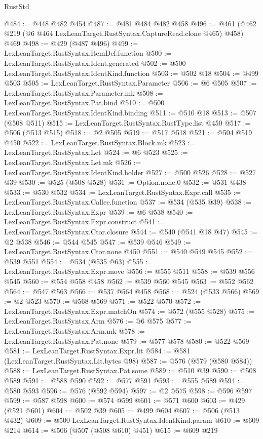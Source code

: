 \begin{lexlean}{RustStd}
\begin{coremodule}
@484 := @448 @482 @454
@487 := @481 @484 @482 @458
@496 := @461 (@462 @219 (@6 @464 LexLeanTarget.RustSyntax.CaptureRead.clone @465) @458) @469
@498 := @429 (@487 @496)
@499 := LexLeanTarget.RustSyntax.ItemDef.function
@500 := LexLeanTarget.RustSyntax.Ident.generated
@502 := @500 LexLeanTarget.RustSyntax.IdentKind.function
@503 := @502 @18
@504 := @499 @503
@505 := LexLeanTarget.RustSyntax.Parameter
@506 := @6 @505
@507 := LexLeanTarget.RustSyntax.Parameter.mk
@508 := LexLeanTarget.RustSyntax.Pat.bind
@510 := @500 LexLeanTarget.RustSyntax.IdentKind.binding
@511 := @510 @18
@513 := @507 (@508 @511)
@515 := LexLeanTarget.RustSyntax.RustType.list @450
@517 := @506 (@513 @515)
@518 := @2 @505
@519 := @517 @518
@521 := @504 @519 @450
@522 := LexLeanTarget.RustSyntax.Block.mk
@523 := LexLeanTarget.RustSyntax.Let
@524 := @6 @523
@525 := LexLeanTarget.RustSyntax.Let.mk
@526 := LexLeanTarget.RustSyntax.IdentKind.holder
@527 := @500 @526
@528 := @527 @39
@530 := @525 (@508 @528)
@531 := Option.none.{0}
@532 := @531 @438
@533 := @530 @532
@534 := LexLeanTarget.RustSyntax.Expr.call
@535 := LexLeanTarget.RustSyntax.Callee.function
@537 := @534 (@535 @39)
@538 := LexLeanTarget.RustSyntax.Expr
@539 := @6 @538
@540 := LexLeanTarget.RustSyntax.Expr.construct
@541 := LexLeanTarget.RustSyntax.Ctor.closure
@544 := @540 (@541 @18 @47)
@545 := @2 @538
@546 := @544 @545
@547 := @539 @546
@549 := LexLeanTarget.RustSyntax.Ctor.none @450
@551 := @540 @549 @545
@552 := @539 @551
@554 := @534 (@535 @63)
@555 := LexLeanTarget.RustSyntax.Expr.move
@556 := @555 @511
@558 := @539 @556 @545
@560 := @554 @558 @458
@562 := @539 @560 @545
@563 := @552 @562
@564 := @547 @563
@566 := @537 @564 @458
@568 := @524 (@533 @566)
@569 := @2 @523
@570 := @568 @569
@571 := @522 @570
@572 := LexLeanTarget.RustSyntax.Expr.matchOn
@574 := @572 (@555 @528)
@575 := LexLeanTarget.RustSyntax.Arm
@576 := @6 @575
@577 := LexLeanTarget.RustSyntax.Arm.mk
@578 := LexLeanTarget.RustSyntax.Pat.none
@579 := @577 @578
@580 := @522 @569
@581 := LexLeanTarget.RustSyntax.Expr.lit
@584 := @581 (LexLeanTarget.RustSyntax.Lit.bytes @98)
@587 := @576 (@579 (@580 @584))
@588 := LexLeanTarget.RustSyntax.Pat.some
@589 := @510 @39
@590 := @508 @589
@591 := @588 @590
@592 := @577 @591
@593 := @555 @589
@594 := @580 @593
@596 := @576 (@592 @594)
@597 := @2 @575
@598 := @596 @597
@599 := @587 @598
@600 := @574 @599
@601 := @571 @600
@603 := @429 (@521 @601)
@604 := @502 @39
@605 := @499 @604
@607 := @506 (@513 @432)
@609 := @500 LexLeanTarget.RustSyntax.IdentKind.param
@610 := @609 @214
@614 := @506 (@507 (@508 @610) @451)
@615 := @609 @219

\end{coremodule}
\end{lexlean}

